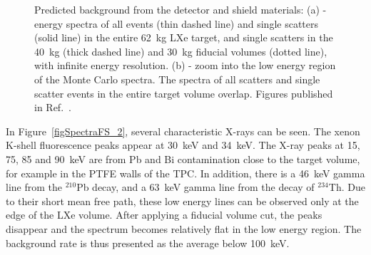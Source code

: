 \begin{figure}[!h]
\centering
{}
\caption[Energy spectra of the predicted background]{Predicted background from the detector and shield materials: (a) - energy spectra of all events (thin dashed line) and single scatters (solid line) in the entire 62~kg LXe target, and single scatters in the 40~kg (thick dashed line) and 30~kg fiducial volumes (dotted line), with infinite energy resolution. (b) - zoom into the low energy region of the Monte Carlo spectra. The spectra of all scatters and single scatter events in the entire target volume overlap. Figures published in Ref.~\cite{EMBG}.}
\label{figSpectraFS}
\end{figure}

In Figure~\ref{figSpectraFS_2}, several characteristic X-rays can be seen. The xenon K-shell fluorescence peaks appear at 30~keV and 34~keV. The X-ray peaks at 15, 75, 85 and 90~keV are from Pb and Bi contamination close to the target volume, for example in the PTFE walls of the TPC. In addition, there is a 46~keV gamma line from the $^{210}$Pb decay, and a 63~keV gamma line from the decay of $^{234}$Th. Due to their short mean free path, these low energy lines can be observed only at the edge of the LXe volume. After applying a fiducial volume cut, the peaks disappear and the spectrum becomes relatively flat in the low energy region. The background rate is thus presented as the average below 100~keV.

